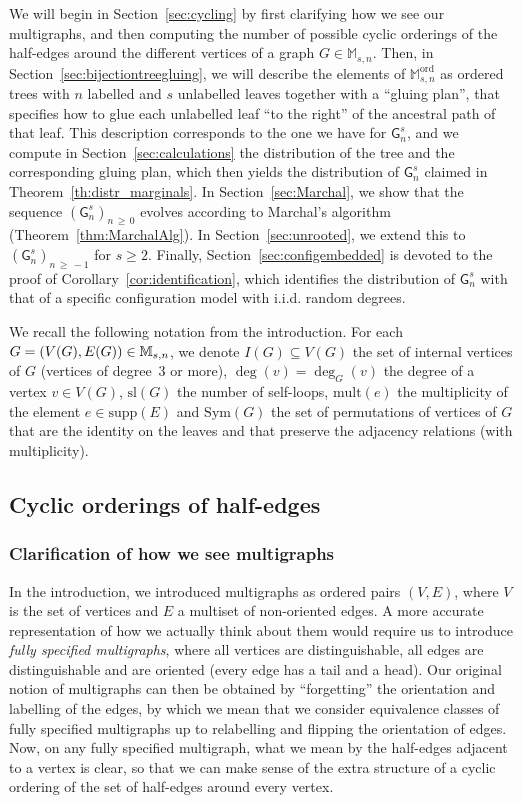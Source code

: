 \documentclass[AHL,Unicode,longabstracts,published]{cedram}
\renewcommand{\subset}{\subseteq}
\newcommand{\supp}{\mathrm{supp}}
\newcommand{\ord}{\mathrm{ord}}
\newcommand{\sll}{\mathrm{sl}}
\newcommand{\Sym}{\mathrm{Sym}}
\newcommand{\mult}{\mathrm{mult}}
\newcommand{\sG}{\mathsf{G}}
\newcommand{\M}{\mathbb{M}}
\begin{document}
We will begin in Section~\ref{sec:cycling} by first clarifying how we see our multigraphs, and then computing the number of possible cyclic orderings of the half-edges around the different vertices of a graph $G\in \M_{s,n}$. Then, in Section~\ref{sec:bijectiontreegluing}, we will describe the elements of $\M_{s,n}^{\ord}$ as ordered trees with $n$ labelled and $s$ unlabelled leaves together with a ``gluing plan'', that specifies how to glue each unlabelled leaf ``to the right'' of the ancestral path of that leaf. This description corresponds to the one we have for $\sG^s_{n}$, and we compute in Section~\ref{sec:calculations} the distribution of the tree and the corresponding gluing plan, which then yields the distribution of $\sG^s_{n}$ claimed in Theorem~\ref{th:distr_marginals}. In Section~\ref{sec:Marchal}, we show that the sequence $\left(\sG^s_{n}\right)_{n\,\ge\,0}$ evolves according to Marchal's algorithm (Theorem~\ref{thm:MarchalAlg}). In Section~\ref{sec:unrooted}, we extend this to $(\sG_{n}^s)_{n\,\ge\,-1}$ for $s \ge 2$. Finally, Section~\ref{sec:configembedded} is devoted to the proof of Corollary~\ref{cor:identification}, which identifies the distribution of $\sG^s_{n}$ with that of a specific configuration model with i.i.d. random degrees.

We recall the following notation from the introduction. For each $G=(V(G),E(G))\linebreak\in \M_{s,n}$, we denote $I(G)\subset V(G)$ the set of internal vertices of $G$ (vertices of degree~$3$ or more), $\deg(v) = \deg_G(v)$ the degree of a vertex $v \in V(G)$, $\sll(G)$ the number of self-loops, $\mult(e)$ the multiplicity of the element $e \in \supp(E)$ and $\Sym(G)$ the set of permutations of vertices of $G$ that are the identity on the leaves and that preserve the adjacency relations (with multiplicity).



\subsection{Cyclic orderings of half-edges}\label{sec:structure multigraph}
\label{sec:cycling}
\subsubsection{Clarification of how we see multigraphs}
In the introduction, we introduced multigraphs as ordered pairs $(V,E)$, where $V$ is the set of vertices and $E$ a multiset of non-oriented edges. A more accurate representation of how we actually think about them would require us to introduce \emph{fully specified multigraphs}, where all vertices are distinguishable, all edges are distinguishable and are oriented (every edge has a tail and a head). Our original notion of multigraphs can then be obtained by ``forgetting'' the orientation and labelling of the edges, by which we mean that we consider equivalence classes of fully specified multigraphs up to relabelling and flipping the orientation of edges. Now, on any fully specified multigraph, what we mean by the half-edges adjacent to a vertex is clear, so that we can make sense of the extra structure of a cyclic ordering of the set of half-edges around every vertex.
\end{document}
